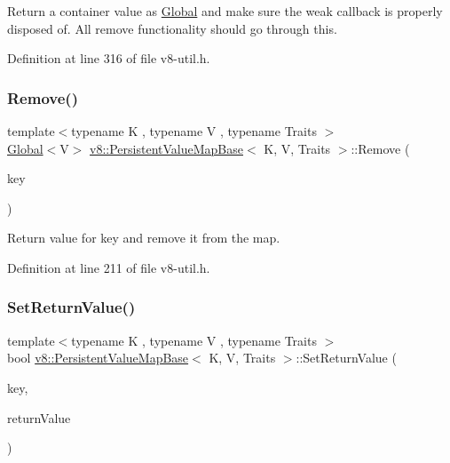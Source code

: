 Return a container value as \mbox{\hyperlink{classv8_1_1Global}{Global}} and make sure the weak callback is properly disposed of. All remove functionality should go through this. 

Definition at line 316 of file v8-\/util.\+h.

\mbox{\label{classv8_1_1PersistentValueMapBase_abd75a4c050416712167ba0bb9eace097}} 
\subsubsection{\texorpdfstring{Remove()}{Remove()}}
{\footnotesize\ttfamily template$<$typename K , typename V , typename Traits $>$ \\
\mbox{\hyperlink{classv8_1_1Global}{Global}}$<$V$>$ \mbox{\hyperlink{classv8_1_1PersistentValueMapBase}{v8\+::\+Persistent\+Value\+Map\+Base}}$<$ K, V, Traits $>$\+::Remove (\begin{DoxyParamCaption}\item[{const K \&}]{key }\end{DoxyParamCaption})\hspace{0.3cm}{\ttfamily [inline]}}

Return value for key and remove it from the map. 

Definition at line 211 of file v8-\/util.\+h.

\mbox{\label{classv8_1_1PersistentValueMapBase_a85201649d2bbd0ffdebe8be3d5c6447a}} 
\subsubsection{\texorpdfstring{Set\+Return\+Value()}{SetReturnValue()}}
{\footnotesize\ttfamily template$<$typename K , typename V , typename Traits $>$ \\
bool \mbox{\hyperlink{classv8_1_1PersistentValueMapBase}{v8\+::\+Persistent\+Value\+Map\+Base}}$<$ K, V, Traits $>$\+::Set\+Return\+Value (\begin{DoxyParamCaption}\item[{const K \&}]{key,  }\item[{\mbox{\hyperlink{classv8_1_1ReturnValue}{Return\+Value}}$<$ \mbox{\hyperlink{classv8_1_1Value}{Value}} $>$}]{return\+Value }\end{DoxyParamCaption})\hspace{0.3cm}{\ttfamily [inline]}}

